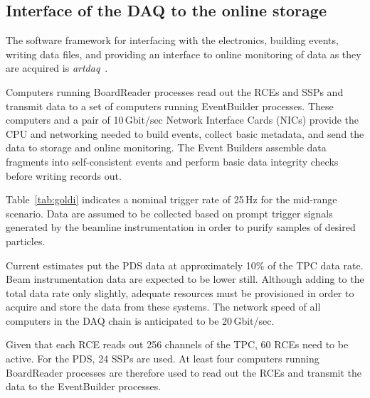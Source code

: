 \subsection{Interface of the DAQ to the online storage}
\label{sec:DAQ_online_interface}

The software framework for
interfacing with the electronics, building events, writing data files,
and providing an interface to online monitoring of data as they are
acquired is \textit{artdaq}~\cite{artdaq}. 

Computers running BoardReader processes read out
the RCEs and SSPs and transmit data to a set of computers running EventBuilder processes.
These computers and a
pair of 10\,Gbit/sec Network Interface Cards (NICs) provide the CPU and networking needed to
build events, collect basic metadata, and send the data to storage and
online monitoring.  The Event Builders assemble data fragments into self-consistent events and perform basic data integrity checks before writing records out.


Table~\ref{tab:goldi} indicates a nominal trigger rate of 25\,Hz for
the mid-range scenario. 
 Data are assumed to be
collected based on prompt trigger signals generated by the beamline
instrumentation in order to purify samples of desired particles.

Current estimates put the PDS data at approximately 10\% 
of the TPC data rate.  Beam instrumentation data are expected to be lower still.
Although adding to the
total data rate only slightly, adequate resources must
be provisioned in order to acquire and store the data from these
systems.  
The network speed of all computers in the DAQ
chain is anticipated to be 20\,Gbit/sec. 


Given that each RCE reads out 256 channels of the TPC, 60 RCEs
need to be active.  For the PDS, 24 SSPs are used.  At least four computers 
running BoardReader processes are therefore used to read out
the RCEs and transmit the data to the EventBuilder processes.

